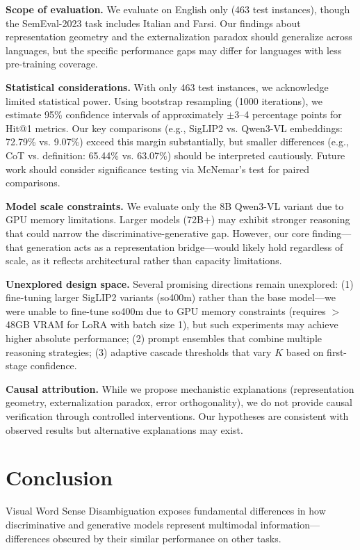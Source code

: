 \documentclass[11pt]{article}
\begin{document}
\textbf{Scope of evaluation.} We evaluate on English only (463 test instances), though the SemEval-2023 task includes Italian and Farsi. Our findings about representation geometry and the externalization paradox should generalize across languages, but the specific performance gaps may differ for languages with less pre-training coverage.

\textbf{Statistical considerations.} With only 463 test instances, we acknowledge limited statistical power. Using bootstrap resampling (1000 iterations), we estimate 95\% confidence intervals of approximately $\pm$3--4 percentage points for Hit@1 metrics. Our key comparisons (e.g., SigLIP2 vs. Qwen3-VL embeddings: 72.79\% vs. 9.07\%) exceed this margin substantially, but smaller differences (e.g., CoT vs. definition: 65.44\% vs. 63.07\%) should be interpreted cautiously. Future work should consider significance testing via McNemar's test for paired comparisons.

\textbf{Model scale constraints.} We evaluate only the 8B Qwen3-VL variant due to GPU memory limitations. Larger models (72B+) may exhibit stronger reasoning that could narrow the discriminative-generative gap. However, our core finding---that generation acts as a representation bridge---would likely hold regardless of scale, as it reflects architectural rather than capacity limitations.

\textbf{Unexplored design space.} Several promising directions remain unexplored: (1) fine-tuning larger SigLIP2 variants (so400m) rather than the base model---we were unable to fine-tune so400m due to GPU memory constraints (requires $>$48GB VRAM for LoRA with batch size 1), but such experiments may achieve higher absolute performance; (2) prompt ensembles that combine multiple reasoning strategies; (3) adaptive cascade thresholds that vary $K$ based on first-stage confidence.

\textbf{Causal attribution.} While we propose mechanistic explanations (representation geometry, externalization paradox, error orthogonality), we do not provide causal verification through controlled interventions. Our hypotheses are consistent with observed results but alternative explanations may exist.

\section{Conclusion}
\label{sec:conclusion}

Visual Word Sense Disambiguation exposes fundamental differences in how discriminative and generative models represent multimodal information---differences obscured by their similar performance on other tasks.
\end{document}
